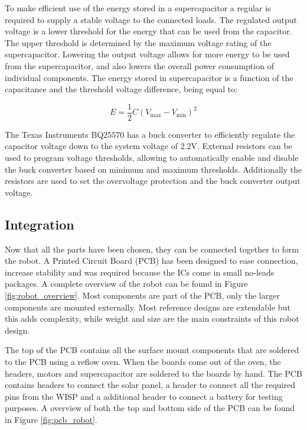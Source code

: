 To make efficient use of the energy stored in a supercapacitor a regular is required to supply a stable voltage to the connected loads.
The regulated output voltage is a lower threshold for the energy that can be used from the capacitor.
The upper threshold is determined by the maximum voltage rating of the supercapacitor.
Lowering the output voltage allows for more energy to be used from the supercapacitor, and also lowers the overall power consumption of individual components.
The energy stored in supercapacitor is a function of the capacitance and the threshold voltage difference, being equal to:

\begin{equation}
\label{eq:cap2}
E = \frac{1}{2}C(V_{\max} - V_{\min})^{2}
\end{equation}

The Texas Instruments BQ25570 has a buck converter to efficiently regulate the capacitor voltage down to the system voltage of 2.2V.
External resistors can be used to program voltage thresholds, allowing to automatically enable and disable the buck converter based on minimum and maximum thresholds.
Additionally the resistors are used to set the overvoltage protection and the buck converter output voltage.

\subsection{Integration}

Now that all the parts have been chosen, they can be connected together to form the robot.
A Printed Circuit Board (PCB) has been designed to ease connection, increase stability and was required because the ICs come in small no-leads packages.
A complete overview of the robot can be found in Figure \ref{fig:robot_overview}.
Most components are part of the PCB, only the larger components are mounted externally.
Most reference designs are extendable but this adds complexity, while weight and size are the main constraints of this robot design.


The top of the PCB contains all the surface mount components that are soldered to the PCB using a reflow oven. 
When the boards come out of the oven, the headers, motors and supercapacitor are soldered to the boards by hand.
The PCB contains headers to connect the solar panel, a header to connect all the required pins from the WISP and a additional header to connect a battery for testing purposes.
A overview of both the top and bottom side of the PCB can be found in Figure \ref{fig:pcb_robot}.


